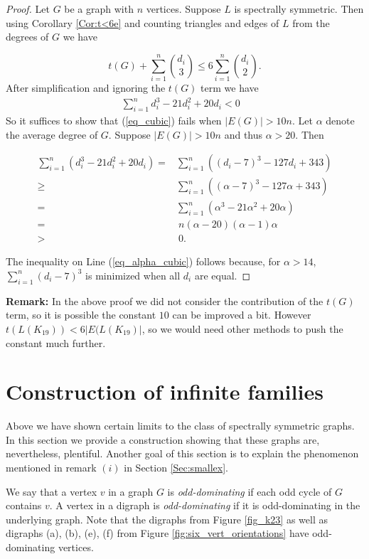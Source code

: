 \documentclass[11pt]{article}
\theoremstyle{plain}
\newcommand{\ssym}[0]{spectrally symmetric }
\newcommand{\ssymend}[0]{spectrally symmetric}
\begin{document}
\begin{proof}

Let $G$ be a graph with $n$ vertices. Suppose $L$ is \ssymend. Then using Corollary \ref{Cor:t<6e} and counting triangles and edges of $L$ from the degrees of $G$ we have

\[t(G)+\sum_{i=1}^n\binom{d_i}{3}\le6\sum_{i=1}^n\binom{d_i}{2}.\]
After simplification and ignoring the $t(G)$ term we have
\begin{align}\sum\limits_{i=1}^nd_i^3-21d_i^2+20d_i<0\hspace{10pt} \label{eq_cubic}
\end{align}
So it suffices to show that  (\ref{eq_cubic}) fails when $|E(G)|> 10n$. Let $\alpha$ denote the average degree of $G$. Suppose $|E(G)|> 10n$ and thus $\alpha>20$. Then

\begin{align}\sum\limits_{i=1}^n(d_i^3-21d_i^2+20d_i)=&\sum_{i=1}^n((d_i-7)^3-127d_i+343)\nonumber\\ 
\geq&\sum_{i=1}^n((\alpha-7)^3-127\alpha+343)\label{eq_alpha_cubic}\\
=&\sum\limits_{i=1}^n(\alpha^3-21\alpha^2+20\alpha)\nonumber\\
=&~n(\alpha-20)(\alpha-1)\alpha \nonumber\\
>&~0.\nonumber\end{align}

The inequality on Line (\ref{eq_alpha_cubic}) follows because, for $\alpha>14$, $\sum_{i=1}^n(d_i-7)^3$ is minimized when all $d_i$ are equal.
\end{proof}

 \noindent \textbf{Remark:} In the above proof we did not consider the contribution of the $t(G)$ term, so it is possible the constant $10$ can be improved a bit. However $t(L(K_{19}))<6|E(L(K_{19})|$, so we would need other methods to push the constant much further.


\section{Construction of infinite families} \label{Sec:Constructions}
Above we have shown certain limits to the class of \ssym graphs. In this section we provide a construction showing that these graphs are, nevertheless, plentiful. Another goal of this section is to explain the phenomenon mentioned in remark $(i)$ in Section \ref{Sec:smallex}.

We say that a vertex $v$ in a graph $G$ is \emph{odd-dominating} if each odd cycle of $G$ contains $v$. A vertex in a digraph is \emph{odd-dominating} if it is odd-dominating in the underlying graph. Note that the digraphs from Figure \ref{fig_k23} as well as digraphs (a), (b), (e), (f) from Figure \ref{fig:six_vert_orientations} have odd-dominating vertices. 
\end{document}
